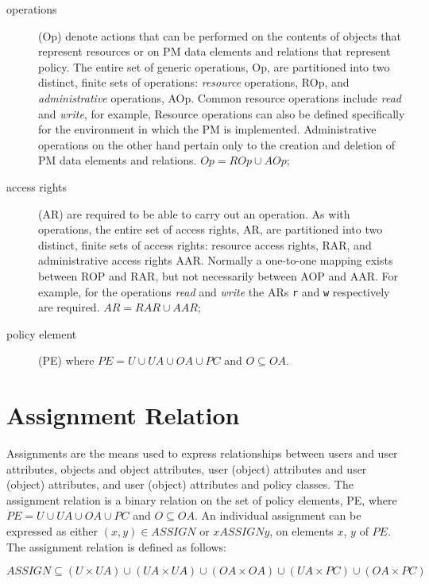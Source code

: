 \documentclass[12pt,a4paper,titlepage]{book}
\begin{document}
\begin{description}
		\item[operations] (Op) denote actions that can be performed on the contents of objects that represent resources or on PM data elements and relations that represent policy. The entire set of generic operations, Op, are partitioned into two distinct, finite sets of operations: \emph{resource} operations, ROp, and \emph{administrative} operations, AOp. Common resource operations include \emph{read} and \emph{write}, for example,
		Resource operations can also be defined specifically for the environment in which the PM is implemented. Administrative operations on the other hand pertain only to the creation
		and deletion of PM data elements and relations. $Op = ROp \cup AOp$;
		
		\item[access rights] (AR) are required to be able to carry out an operation. As with
		operations, the entire set of access rights, AR, are partitioned into two distinct, finite sets of access rights: resource access rights, RAR, and administrative access rights AAR. Normally a one-to-one mapping exists between ROP and RAR, but not necessarily between AOP and AAR. For example, for the operations \emph{read} and \emph{write} the ARs \lstinline|r| and \lstinline|w| respectively are required. $AR = RAR \cup AAR$;
		
		\item[policy element] (PE) where $PE = U \cup UA \cup OA \cup PC$ and $O \subseteq OA$.
		
	\end{description}

	\section{Assignment Relation}
	
	Assignments are the means used to express relationships between users and user attributes,
	objects and object attributes, user (object) attributes and user (object) attributes, and user (object) attributes and policy classes. The assignment relation is a binary relation on the set of policy elements, PE, where $PE = U \cup UA \cup OA \cup PC$ and $O \subseteq OA$. An individual assignment can be expressed as either $(x, y) \in ASSIGN$ or $x ASSIGN y$, on elements $x$, $y$ of $PE$. The assignment relation is defined as follows:
	
	\begin{equation}
	ASSIGN \subseteq (U \times UA) \cup (UA \times UA) \cup (OA \times OA) \cup (UA \times PC) \cup (OA \times PC) 
	\end{equation}
	
\end{document}
